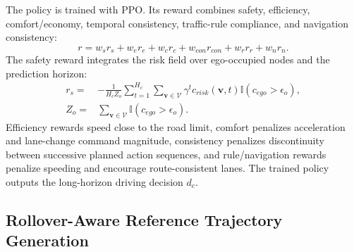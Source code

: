 The policy is trained with PPO. Its reward combines safety, efficiency, comfort/economy, temporal consistency, traffic-rule compliance, and navigation consistency:
\begin{equation}
  r=w_s r_s+w_e r_e+w_c r_c+w_{con}r_{con}+w_r r_r+w_n r_n.
  \label{eq:cloud_reward}
\end{equation}
The safety reward integrates the risk field over ego-occupied nodes and the prediction horizon:
\begin{equation}
  \begin{aligned}
  r_s=&-\frac{1}{H_c Z_o}
  \sum_{t=1}^{H_c}\sum_{\mathbf{v}\in\mathcal{V}}
  \gamma^t c_{risk}(\mathbf{v},t)\mathbb{I}(c_{ego}>\epsilon_o),\\
  Z_o=&\sum_{\mathbf{v}\in\mathcal{V}}\mathbb{I}(c_{ego}>\epsilon_o).
  \end{aligned}
  \label{eq:safety_reward}
\end{equation}
Efficiency rewards speed close to the road limit, comfort penalizes acceleration and lane-change command magnitude, consistency penalizes discontinuity between successive planned action sequences, and rule/navigation rewards penalize speeding and encourage route-consistent lanes. The trained policy outputs the long-horizon driving decision $d_c$.

\subsection{Rollover-Aware Reference Trajectory Generation}

